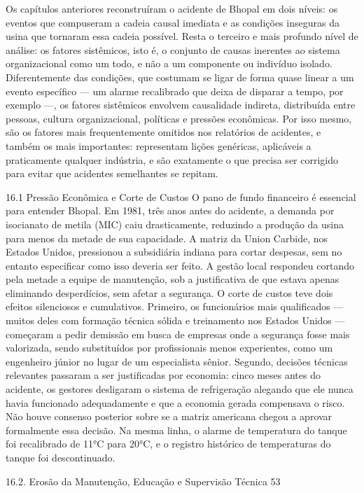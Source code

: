 Os capítulos anteriores reconstruíram o acidente de Bhopal em dois níveis: os eventos que compuseram a cadeia causal imediata e as condições inseguras da usina que tornaram essa cadeia possível. Resta o terceiro e mais profundo nível de análise: os fatores sistêmicos, isto é, o conjunto de causas inerentes ao sistema organizacional como um todo, e não a um componente ou indivíduo isolado. Diferentemente das condições, que costumam se ligar de forma quase linear a um evento específico — um alarme recalibrado que deixa de disparar a tempo, por exemplo —, os fatores sistêmicos envolvem causalidade indireta, distribuída entre pessoas, cultura organizacional, políticas e pressões econômicas. Por isso mesmo, são os fatores mais frequentemente omitidos nos relatórios de acidentes, e também os mais importantes: representam lições genéricas, aplicáveis a praticamente qualquer indústria, e são exatamente o que precisa ser corrigido para evitar que acidentes semelhantes se repitam.

16.1 Pressão Econômica e Corte de Custos O pano de fundo financeiro é essencial para entender Bhopal. Em 1981, três anos antes do acidente, a demanda por isocianato de metila (MIC) caiu drasticamente, reduzindo a produção da usina para menos da metade de sua capacidade. A matriz da Union Carbide, nos Estados Unidos, pressionou a subsidiária indiana para cortar despesas, sem no entanto especificar como isso deveria ser feito. A gestão local respondeu cortando pela metade a equipe de manutenção, sob a justificativa de que estava apenas eliminando desperdícios, sem afetar a segurança. O corte de custos teve dois efeitos silenciosos e cumulativos. Primeiro, os funcionários mais qualificados — muitos deles com formação técnica sólida e treinamento nos Estados Unidos — começaram a pedir demissão em busca de empresas onde a segurança fosse mais valorizada, sendo substituídos por profissionais menos experientes, como um engenheiro júnior no lugar de um especialista sênior. Segundo, decisões técnicas relevantes passaram a ser justificadas por economia: cinco meses antes do acidente, os gestores desligaram o sistema de refrigeração alegando que ele nunca havia funcionado adequadamente e que a economia gerada compensava o risco. Não houve consenso posterior sobre se a matriz americana chegou a aprovar formalmente essa decisão. Na mesma linha, o alarme de temperatura do tanque foi recalibrado de 11°C para 20°C, e o registro histórico de temperaturas do tanque foi descontinuado.

16.2. Erosão da Manutenção, Educação e Supervisão Técnica 53

